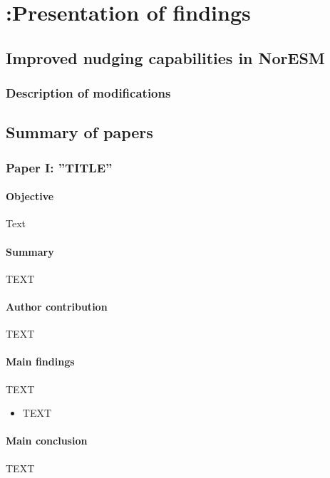 \chapter[Presentation of findings]{{\color{red} :}Presentation of findings}
%
\label{ch:findings}
%

\section{Improved nudging capabilities in NorESM}\label{ch:nudging_improve}
\subsection{Description of modifications}



\newpage
\section{Summary of papers}\label{sec:papersummary}

\subsection{Paper I: ''TITLE''}
\subsubsection{Objective}
Text
\subsubsection{Summary}
TEXT
\subsubsection{Author contribution}
TEXT

\subsubsection{Main findings}
TEXT %
\begin{itemize}
 \item TEXT
\end{itemize}

\subsubsection{Main conclusion}
TEXT

